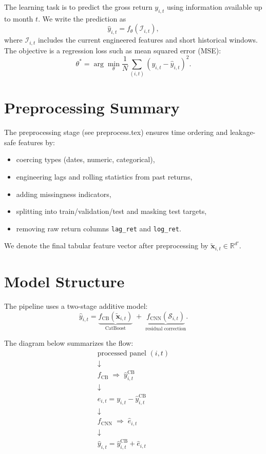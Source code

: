 \documentclass[11pt]{article}
\begin{document}
The learning task is to predict the gross return $y_{i,t}$ using information
available up to month $t$. We write the prediction as
\[
\hat{y}_{i,t} = f_{\theta}(\mathcal{I}_{i,t}),
\]
where $\mathcal{I}_{i,t}$ includes the current engineered features and short
historical windows. The objective is a regression loss such as mean squared
error (MSE):
\[
\theta^* = \arg\min_{\theta} \frac{1}{N} \sum_{(i,t)} (y_{i,t} - \hat{y}_{i,t})^2.
\]

\section{Preprocessing Summary}

The preprocessing stage (see preprocess.tex) ensures time ordering and
leakage-safe features by:
\begin{itemize}
	\item coercing types (dates, numeric, categorical),
	\item engineering lags and rolling statistics from past returns,
	\item adding missingness indicators,
	\item splitting into train/validation/test and masking test targets,
	\item removing raw return columns \texttt{lag\_ret} and \texttt{log\_ret}.
\end{itemize}

We denote the final tabular feature vector after preprocessing by
$\tilde{\mathbf{x}}_{i,t} \in \mathbb{R}^{d'}$.

\section{Model Structure}

The pipeline uses a two-stage additive model:
\[
\hat{y}_{i,t} = \underbrace{f_{\text{CB}}(\tilde{\mathbf{x}}_{i,t})}_{\text{CatBoost}}
\; + \; \underbrace{f_{\text{CNN}}(\mathcal{S}_{i,t})}_{\text{residual correction}}.
\]

The diagram below summarizes the flow:
\[
\begin{array}{c}
\text{processed panel } (i,t)
\\ \downarrow \\
f_{\text{CB}} \;\Rightarrow\; \hat{y}^{\text{CB}}_{i,t}
\\ \downarrow \\
e_{i,t} = y_{i,t} - \hat{y}^{\text{CB}}_{i,t}
\\ \downarrow \\
f_{\text{CNN}} \;\Rightarrow\; \hat{e}_{i,t}
\\ \downarrow \\
\hat{y}_{i,t} = \hat{y}^{\text{CB}}_{i,t} + \hat{e}_{i,t}
\end{array}
\]
\end{document}
